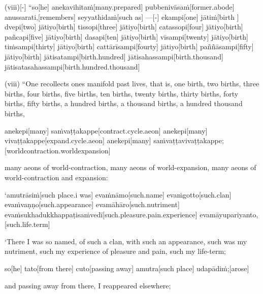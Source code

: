 \begin{samepage}
\begingl[glneveryline={\PaliGlossA,\PaliGlossB}]
(viii)[-] “so[he] anekavihitaṁ[many.prepared] pubbenivāsaṁ[former.abode] anussarati,[remembers] seyyathidaṁ[such as] —[-] ekampi[one] jātiṁ[birth ] dvepi[two] jātiyo[birth] tissopi[three] jātiyo[birth] catassopi[four] jātiyo[birth] pañcapi[five] jātiyo[birth] dasapi[ten] jātiyo[birth] vīsampi[twenty] jātiyo[birth] tiṁsampi[thirty] jātiyo[birth] cattārīsampi[fourty] jātiyo[birth] paññāsampi[fifty] jātiyo[birth] jātisatampi[birth.hundred] jātisahassampi[birth.thousand] jātisatasahassampi[birth.hundred.thousand]
\endgl
\nopagebreak
\linespread{0.5}
\begin{spacin}{0.2}
{\PaliGlossFT (viii) “One recollects ones manifold past lives, that is, one birth, two births, three births, four births, five births, ten births, twenty births, thirty births, forty births, fifty births, a hundred births, a thousand births, a hundred thousand births,}
\end{spacin}
\vskip 12pt
\end{samepage}
\begin{samepage}
\begingl[glneveryline={\PaliGlossA,\PaliGlossB}]
anekepi[many] saṁvaṭṭakappe[contract.cycle.aeon] anekepi[many] vivaṭṭakappe[expand.cycle.aeon] anekepi[many] saṁvaṭṭavivaṭṭakappe;[worldcontraction.worldexpansion]
\endgl
\nopagebreak
\linespread{0.5}
\begin{spacin}{0.2}
{\PaliGlossFT many aeons of world-contraction, many aeons of world-expansion, many aeons of world-contraction and expansion:}
\end{spacin}
\vskip 12pt
\end{samepage}
\begin{samepage}
\begingl[glneveryline={\PaliGlossA,\PaliGlossB}]
‘amutrāsiṁ[such place.i was] evaṁnāmo[such.name] evaṁgotto[such.clan] evaṁvaṇṇo[such.appearance] evamāhāro[such.nutriment] evaṁsukhadukkhappaṭisaṁvedī[such.pleasure.pain.experience] evamāyupariyanto,[such.life.term]
\endgl
\nopagebreak
\linespread{0.5}
\begin{spacin}{0.2}
{\PaliGlossFT ‘There I was so named, of such a clan, with such an appearance, such was my nutriment, such my experience of pleasure and pain, such my life-term;}
\end{spacin}
\vskip 12pt
\end{samepage}
\begin{samepage}
\begingl[glneveryline={\PaliGlossA,\PaliGlossB}]
so[he] tato[from there] cuto[passing away] amutra[such place] udapādiṁ;[arose]
\endgl
\nopagebreak
\linespread{0.5}
\begin{spacin}{0.2}
{\PaliGlossFT and passing away from there, I reappeared elsewhere;}
\end{spacin}
\vskip 12pt
\end{samepage}
